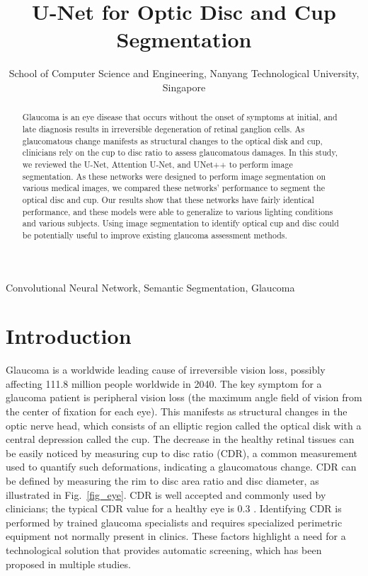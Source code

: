 \documentclass[conference]{IEEEtran}
\begin{document}
\title{U-Net for Optic Disc and Cup Segmentation}

\author{
School of Computer Science and Engineering, Nanyang Technological University, Singapore
}

\maketitle

\begin{abstract}
Glaucoma is an eye disease that occurs without the onset of symptoms at initial, and late diagnosis results in irreversible degeneration of retinal ganglion cells. As glaucomatous change manifests as structural changes to the optical disk and cup, clinicians rely on the cup to disc ratio to assess glaucomatous damages. In this study, we reviewed the U-Net, Attention U-Net, and UNet++ to perform image segmentation. As these networks were designed to perform image segmentation on various medical images, we compared these networks' performance to segment the optical disc and cup. Our results show that these networks have fairly identical performance, and these models were able to generalize to various lighting conditions and various subjects. Using image segmentation to identify optical cup and disc could be potentially useful to improve existing glaucoma assessment methods.
\end{abstract}

\begin{IEEEkeywords}
Convolutional Neural Network, Semantic Segmentation, Glaucoma
\end{IEEEkeywords}

\section{Introduction}

Glaucoma is a worldwide leading cause of irreversible vision loss, possibly affecting 111.8 million people worldwide in 2040\cite{tham2014global}. The key symptom for a glaucoma patient is peripheral vision loss (the maximum angle field of vision from the center of fixation for each eye). This manifests as structural changes in the optic nerve head, which consists of an elliptic region called the optical disk with a central depression called the cup. The decrease in the healthy retinal tissues can be easily noticed by measuring cup to disc ratio (CDR), a common measurement used to quantify such deformations, indicating a glaucomatous change. CDR can be defined by measuring the rim to disc area ratio and disc diameter, as illustrated in Fig.~\ref{fig_eye}. CDR is well accepted and commonly used by clinicians; the typical CDR value for a healthy eye is 0.3 \cite{eye2004prevalence}. Identifying CDR is performed by trained glaucoma specialists and requires specialized perimetric equipment not normally present in clinics. These factors highlight a need for a technological solution that provides automatic screening, which has been proposed in multiple studies\cite{joshi2011optic,yin2011model,cheng2013superpixel,cheng2017quadratic,fu2018joint}.
\end{document}
